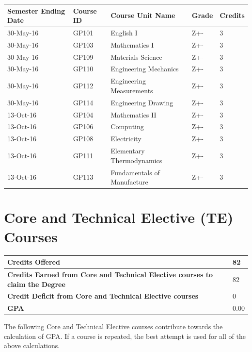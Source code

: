 \documentclass[12pt]{article}
\begin{document}
\begin{table}[h]
\begin{tabularx}{\textwidth}{|X|l|l|l|l|}
\hline 
\textbf{Semester Ending Date} & \textbf{Course ID} & \textbf{Course Unit Name} & \textbf{Grade} & \textbf{Credits} \\ 
\hline
30-May-16 & GP101 & English I & Z+- & 3 \\ 
\hline
30-May-16 & GP103 & Mathematics I & Z+- & 3 \\ 
\hline
30-May-16 & GP109 & Materials Science & Z+- & 3 \\ 
\hline
30-May-16 & GP110 & Engineering Mechanics & Z+- & 3 \\ 
\hline
30-May-16 & GP112 & Engineering Measurements & Z+- & 3 \\ 
\hline
30-May-16 & GP114 & Engineering Drawing & Z+- & 3 \\ 
\hline
13-Oct-16 & GP104 & Mathematics II & Z+- & 3 \\ 
\hline
13-Oct-16 & GP106 & Computing & Z+- & 3 \\ 
\hline
13-Oct-16 & GP108 & Electricity & Z+- & 3 \\ 
\hline
13-Oct-16 & GP111 & Elementary Thermodynamics & Z+- & 3 \\ 
\hline
13-Oct-16 & GP113 & Fundamentals of Manufacture & Z+- & 3 \\ 
\hline
\end{tabularx}
\end{table}

\vspace{-10pt}

\section*{Core and Technical Elective (TE) Courses}

\begin{tabularx}{\textwidth}{|X|l|}
\hline 
\textbf{Credits Offered} & 82 \\ \hline 
\textbf{Credits Earned from Core and Technical Elective courses to claim the Degree} & 82 \\ \hline 
\textbf{Credit Deficit from Core and Technical Elective courses} & 0 \\
\hline 
\textbf{GPA} & 0.00 \\
\hline 
\end{tabularx}

The following Core and Technical Elective courses contribute towards the calculation of GPA. If a course is repeated, the best attempt is used for all of the above calculations.
\end{document}
